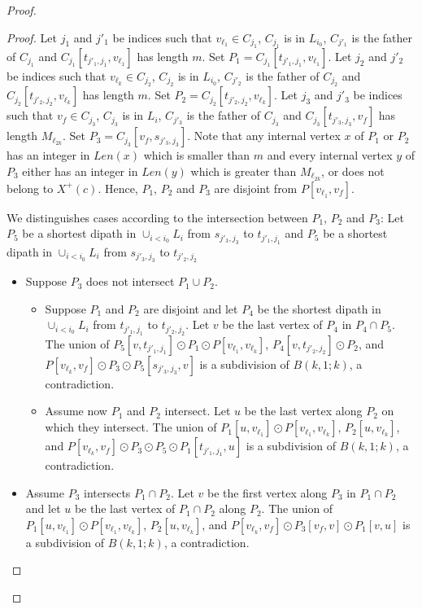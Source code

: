 \documentclass{endm}
\begin{document}
\begin{proof}
\begin{proof}
Let $j_1$ and $j'_1$ be indices such that $v_{\ell_1} \in C_{j_1}$, $C_{j_1}$ is in $L_{i_0}$, $C_{j'_1}$ is the father of $C_{j_1}$ and 
$C_{j_1}[t_{j'_1,j_1},v_{\ell_1}]$ has length $m$. Set $P_1=C_{j_1}[t_{j'_1,j_1},v_{\ell_1}]$.
Let $j_2$ and $j'_2$ be indices such that $v_{\ell_k} \in C_{j_2}$, $C_{j_2}$ is in $L_{i_0}$, $C_{j'_2}$ is the father of $C_{j_2}$  and 
$C_{j_2}[t_{j'_2,j_2},v_{\ell_k}]$ has length $m$. Set $P_2=C_{j_2}[t_{j'_2,j_2},v_{\ell_k}]$.
Let $j_3$ and $j'_3$ be indices such that $v_{f} \in C_{j_3}$, $C_{j_3}$ is in $L_i$, $C_{j'_3}$ is the father of $C_{j_3}$  and 
$C_{j_3}[t_{j'_3,j_3}, v_{f}]$ has length $M_{\ell_{2k}}$. Set $P_3=C_{j_3}[v_{f},s_{j'_3,j_3}]$.
Note that any internal vertex $x$ of $P_1$ or $P_2$ has an integer in $Len(x)$
which is smaller than $m$ and every internal vertex $y$ of $P_3$  either has an integer in $Len(y)$ which
is greater than $M_{\ell_{2k}}$, or does not belong to $X^+(c)$. Hence, 
$P_1$, $P_2$ and $P_3$ are disjoint from $P[v_{\ell_1},v_f]$. 

We distinguishes cases according to the intersection between $P_1$, $P_2$ and $P_3$:
Let $P_5$ be a shortest dipath in $\cup_{i < i_0} L_i$ from $s_{j'_3,j_3}$ to $t_{j'_1,j_1}$ and
 $P_5$ be a shortest dipath in $\cup_{i < i_0} L_i$ from $s_{j'_3,j_3}$ to $t_{j'_2,j_2}$ 


\begin{itemize}
	\item Suppose $P_3$ does not intersect $P_1 \cup P_2$. 
	\begin{itemize}
		\item Suppose $P_1$ and $P_2$ are disjoint and let $P_4$ be the shortest dipath in $\cup_{i < i_0} L_i$ 
from $t_{j'_1,j_1}$ to $t_{j'_2,j_2}$. Let $v$ be the last vertex of $P_4$ in $P_4 \cap P_5$.
The union of $P_5[v, t_{j'_1,j_1}] \odot P_1 \odot P[v_{\ell_1}, v_{\ell_k}]$, $P_4[v,t_{j'_2,j_2}] \odot P_2$,
and $P[v_{\ell_k}, v_f] \odot P_3 \odot P_5[s_{j'_3,j_3}, v]$ is a subdivision of $B(k,1;k)$,  a contradiction.

	
		\item Assume now $P_1$ and $P_2$ intersect. Let $u$ be the last vertex along $P_2$ on which they intersect.
		 The union of $P_1[u,v_{\ell_1}]\odot P[v_{\ell_1}, v_{\ell_k}]$, $P_2[u, v_{\ell_k}]$, and $P[v_{\ell_k}, v_f]\odot P_3\odot P_5 \odot P_1[t_{j'_1,j_1}, u]$ is a subdivision of $B(k,1;k)$, a contradiction.
	\end{itemize}

	\item Assume $P_3$ intersects $P_1\cap P_2$. Let $v$ be the first vertex along $P_3$ in $P_1\cap P_2$ and let $u$ be the last vertex of $P_1\cap P_2$ along $P_2$. The union of $P_1[u,v_{\ell_1}]\odot P[v_{\ell_1}, v_{\ell_k}]$, $P_2[u, v_{\ell_k}]$, and $P[v_{\ell_k}, v_f]\odot P_3[v_f,v]\odot P_1[v, u]$ is a subdivision of $B(k,1;k)$, a contradiction.


\end{itemize}
\end{proof}
\end{proof}
\end{document}
